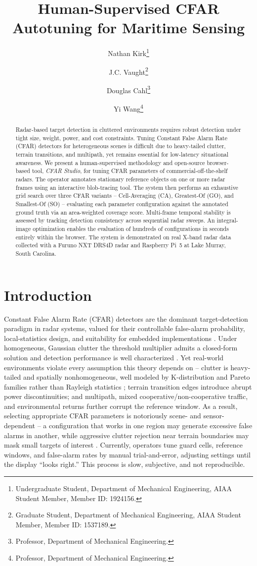 \documentclass[conf]{new-aiaa}
\title{Human-Supervised CFAR Autotuning for Maritime Sensing}
\author{Nathan Kirk\footnote{Undergraduate Student, Department of Mechanical Engineering, AIAA Student Member, Member ID: 1924156.}}
\author{J.C. Vaught\footnote{Graduate Student, Department of Mechanical Engineering, AIAA Student Member, Member ID: 1537189.}}
\author{Douglas Cahl\footnote{Professor, Department of Mechanical Engineering.}}
\author{Yi Wang\footnote{Professor, Department of Mechanical Engineering.}}
\affil{University of South Carolina, Columbia, SC, 29208}
\date{}
\begin{document}
\maketitle

\begin{abstract}
Radar-based target detection in cluttered environments requires robust detection under tight size, weight, power, and cost constraints. Tuning Constant False Alarm Rate (CFAR) detectors for heterogeneous scenes is difficult due to heavy-tailed clutter, terrain transitions, and multipath, yet remains essential for low-latency situational awareness. We present a human-supervised methodology and open-source browser-based tool, \emph{CFAR Studio}, for tuning CFAR parameters of commercial-off-the-shelf radars. The operator annotates stationary reference objects on one or more radar frames using an interactive blob-tracing tool. The system then performs an exhaustive grid search over three CFAR variants -- Cell-Averaging (CA), Greatest-Of (GO), and Smallest-Of (SO) -- evaluating each parameter configuration against the annotated ground truth via an area-weighted coverage score. Multi-frame temporal stability is assessed by tracking detection consistency across sequential radar sweeps. An integral-image optimization enables the evaluation of hundreds of configurations in seconds entirely within the browser. The system is demonstrated on real X-band radar data collected with a Furuno NXT DRS4D radar and Raspberry Pi~5 at Lake Murray, South Carolina.
\end{abstract}

\section{Introduction}
Constant False Alarm Rate (CFAR) detectors are the dominant target-detection paradigm in radar systems, valued for their controllable false-alarm probability, local-statistics design, and suitability for embedded implementations \cite{farina2005review, gandhi1988}. Under homogeneous, Gaussian clutter the threshold multiplier admits a closed-form solution and detection performance is well characterized \cite{finn1968, richards2005}. Yet real-world environments violate every assumption this theory depends on -- clutter is heavy-tailed and spatially nonhomogeneous, well modeled by K-distribution and Pareto families rather than Rayleigh statistics \cite{ward2006, fioranelli2014}; terrain transition edges introduce abrupt power discontinuities; and multipath, mixed cooperative/non-cooperative traffic, and environmental returns further corrupt the reference window. As a result, selecting appropriate CFAR parameters is notoriously scene- and sensor-dependent -- a configuration that works in one region may generate excessive false alarms in another, while aggressive clutter rejection near terrain boundaries may mask small targets of interest \cite{dhs2009}. Currently, operators tune guard cells, reference windows, and false-alarm rates by manual trial-and-error, adjusting settings until the display ``looks right.'' This process is slow, subjective, and not reproducible.
\end{document}
